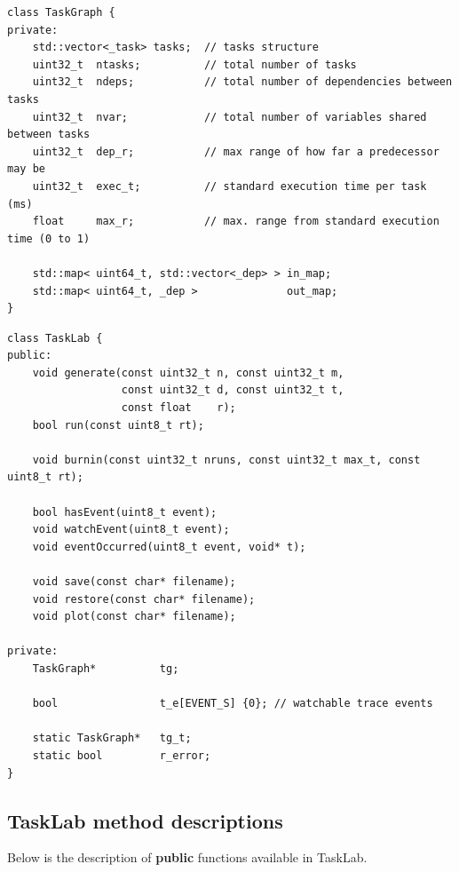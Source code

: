 \begin{verbatim}
class TaskGraph {
private:
    std::vector<_task> tasks;  // tasks structure
    uint32_t  ntasks;          // total number of tasks
    uint32_t  ndeps;           // total number of dependencies between tasks
    uint32_t  nvar;            // total number of variables shared between tasks
    uint32_t  dep_r;           // max range of how far a predecessor may be
    uint32_t  exec_t;          // standard execution time per task (ms)
    float     max_r;           // max. range from standard execution time (0 to 1)

    std::map< uint64_t, std::vector<_dep> > in_map;
    std::map< uint64_t, _dep >              out_map;
}
\end{verbatim}

\begin{verbatim}
class TaskLab {
public:
    void generate(const uint32_t n, const uint32_t m,
                  const uint32_t d, const uint32_t t,
                  const float    r);
    bool run(const uint8_t rt);

    void burnin(const uint32_t nruns, const uint32_t max_t, const uint8_t rt);

    bool hasEvent(uint8_t event);
    void watchEvent(uint8_t event);
    void eventOccurred(uint8_t event, void* t);

    void save(const char* filename);
    void restore(const char* filename);
    void plot(const char* filename);

private:
    TaskGraph*          tg;

    bool                t_e[EVENT_S] {0}; // watchable trace events

    static TaskGraph*   tg_t;
    static bool         r_error;
}
\end{verbatim}

\subsection{TaskLab method descriptions}
Below is the description of \textbf{public} functions available in TaskLab.

